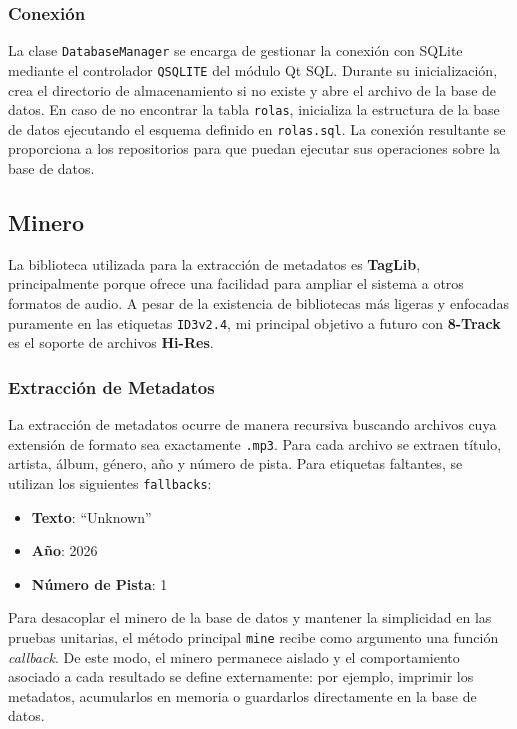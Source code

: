 \subsubsection*{Conexión}

La clase \texttt{DatabaseManager} se encarga de gestionar la conexión con SQLite mediante el controlador \texttt{QSQLITE}
del módulo Qt SQL. Durante su inicialización, crea el directorio de almacenamiento si no existe y abre
el archivo de la base de datos. En caso de no encontrar la tabla \texttt{rolas}, inicializa la estructura
de la base de datos ejecutando el esquema definido en \texttt{rolas.sql}. La conexión resultante se proporciona
a los repositorios para que puedan ejecutar sus operaciones sobre la base de datos.

\subsection{Minero}

La biblioteca utilizada para la extracción de metadatos es \textbf{TagLib}, principalmente porque ofrece
una facilidad para ampliar el sistema a otros formatos de audio. A pesar de la existencia de bibliotecas
más ligeras y enfocadas puramente en las etiquetas \texttt{ID3v2.4}, mi principal objetivo a futuro
con \textbf{8-Track} es el soporte de archivos \textbf{Hi-Res}.

\subsubsection*{Extracción de Metadatos}

La extracción de metadatos ocurre de manera recursiva buscando archivos cuya extensión
de formato sea exactamente \texttt{.mp3}. Para cada archivo se extraen título, artista, álbum,
género, año y número de pista. Para etiquetas faltantes, se utilizan los siguientes \texttt{fallbacks}:

\begin{itemize}
	\item \textbf{Texto}: \enquote{Unknown}
	\item \textbf{Año}: 2026
	\item \textbf{Número de Pista}: 1
\end{itemize}

Para desacoplar el minero de la base de datos y mantener la simplicidad en las pruebas unitarias,
el método principal \texttt{mine} recibe como argumento una función \textit{callback}. De este modo,
el minero permanece aislado y el comportamiento asociado a cada resultado se define externamente:
por ejemplo, imprimir los metadatos, acumularlos en memoria o guardarlos directamente en la base
de datos.


